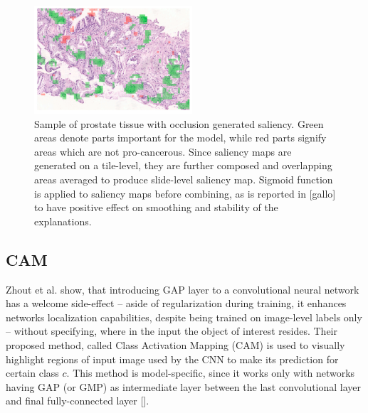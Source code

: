 \begin{figure}[!h]
    \begin{center}
    \begin{minipage}{1\textwidth}
      \includegraphics[width=\textwidth]{img/occ-saliency.png}
    \end{minipage}
    \caption{Sample of prostate tissue with occlusion generated saliency. Green areas denote parts important for the model, while red parts signify areas which are not pro-cancerous. Since saliency maps are generated on a tile-level, they are further composed and overlapping areas averaged to produce slide-level saliency map. Sigmoid function is applied to saliency maps before combining, as is reported in [gallo] to have positive effect on smoothing and stability of the explanations.}
    \label{fig:occ-saliency}
    \end{center}
\end{figure}


\subsection{CAM}

Zhout et al. show, that introducing GAP layer to a convolutional neural network has a welcome side-effect -- aside of regularization during training, it enhances networks localization capabilities, despite being trained on image-level labels only -- without specifying, where in the input the object of interest resides. Their proposed method, called Class Activation Mapping (CAM) is used to visually highlight regions of input image used by the CNN to make its prediction for certain class $c$. This method is model-specific, since it works only with networks having GAP (or GMP) as intermediate layer between the last convolutional layer and final fully-connected layer []. 

